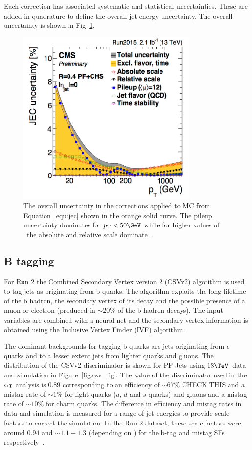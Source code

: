 Each correction has associated systematic and statistical uncertainties. These are added in quadrature to define the overall jet energy uncertainty. The 
overall uncertainty is shown in Fig~\ref{fig:jec_unc}.

\begin{figure}
\centering
    \includegraphics[width=0.8\textwidth]{./Figures/reconstruction/jec_unc.png}
  \caption{\label{fig:jec_unc} The overall uncertainty in the corrections applied to MC from Equation~\ref{equ:jec} shown in the orange solid curve. The pileup uncertainty dominates
for $\pt < 50\GeV$ while for higher values of \pt~the absolute and relative scale dominate~\cite{jec_fig}.}
\end{figure}

\subsection{B tagging}
\label{sec:btag}
For Run 2 the Combined Secondary Vertex version 2 (CSVv2) algorithm is used to tag jets as originating
from b quarks. The algorithm exploits the long lifetime of the b hadron, the secondary vertex of its decay
and the possible presence of a muon or electron (produced in $\sim 20\%$ of the b hadron decays). The 
input variables are combined with a neural net and the secondary vertex
information is obtained using the Inclusive Vertex Finder (IVF) algorithm~\cite{csv_pas}.

The dominant backgrounds for tagging b quarks are jets originating from c quarks and to a lesser extent
jets from lighter quarks and gluons. The distribution of the CSVv2 discriminator is shown for PF Jets
using $13\TeV$~data and simulation in Figure~\ref{fig:csv_fig}. The value of the discriminator
used in the $\alpha_{\text{T}}$ analysis is 0.89 corresponding to an efficiency of $\sim67\%$ CHECK THIS and 
a mistag rate of $\sim 1\%$ for light quarks ($u$, $d$ and $s$ quarks) and gluons and a mistag rate of $\sim 10\%$ for
charm quarks. The difference in efficiency and mistag rates in data and simulation is measured 
for a range of jet energies to provide scale factors to correct the simulation. In the
Run 2 dataset, these scale factors were around $0.94$ and $\sim1.1-1.3$ (depending on \pt) for the b-tag and mistag SFs 
respectively~\cite{csv_fig}.

